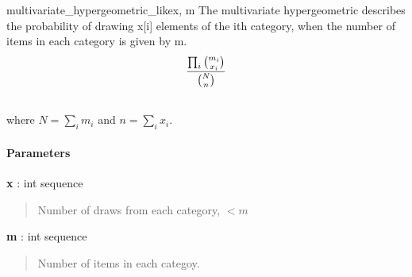 \hypertarget{pymc.distributions.multivariate_hypergeometric_like}{}
\begin{funcdesc}{multivariate\_hypergeometric\_like}{x, m}
The multivariate hypergeometric describes the probability of drawing x{[}i{]}
elements of the ith category, when the number of items in each category is
given by m.
\begin{gather}
\begin{split}\frac{\prod_i \binom{m_i}{x_i}}{\binom{N}{n}}\end{split}\notag\\\begin{split}\end{split}\notag
\end{gather}
where $N = \sum_i m_i$ and $n = \sum_i x_i$.
\paragraph{Parameters}\begin{paramlist}

\item[] \textbf{x} : int sequence
\begin{quote}

Number of draws from each category, $< m$
\end{quote}

\item[] \textbf{m} : int sequence
\begin{quote}

Number of items in each categoy.
\end{quote}
\end{paramlist}
\end{funcdesc}

